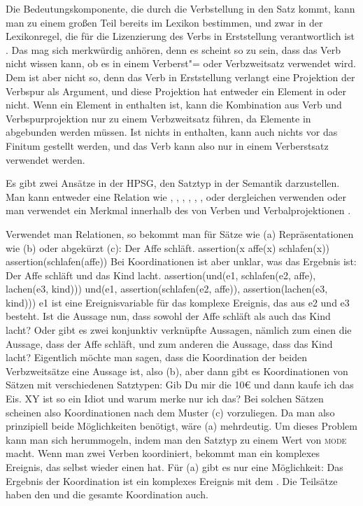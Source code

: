 Die Bedeutungskomponente, die durch die Verbstellung in den Satz kommt, kann man zu einem
großen Teil bereits im Lexikon bestimmen, und zwar in der Lexikonregel, die für die Lizenzierung
des Verbs in Erststellung verantwortlich ist \citep[]{Kiss95b}. Das mag sich merkwürdig anhören, denn es scheint
so zu sein, dass das Verb nicht wissen kann, ob es in einem Verberst"= oder Verbzweitsatz verwendet
wird. Dem ist aber nicht so, denn das Verb in Erststellung verlangt eine Projektion der Verbspur
als Argument, und diese Projektion hat entweder ein Element in \slasch oder nicht. Wenn ein Element
in \slasch enthalten ist, kann die Kombination aus Verb und Verbspurprojektion nur zu einem Verbzweitsatz
führen, da Elemente in \slasch abgebunden werden müssen. Ist nichts in \slasch enthalten, kann auch nichts
vor das Finitum gestellt werden, und das Verb kann also nur in einem Verberstsatz verwendet werden.

Es gibt zwei Ansätze in der HPSG, den Satztyp in der Semantik darzustellen. Man kann entweder eine
Relation wie , , ,
, , ,  oder dergleichen verwenden
\parencites[378, 380]{GSag2000a-u}[59]{Kathol2001a}[Abschnitt~6.1.4]{mrs}{MuellerSatztypen} oder
man verwendet ein Merkmal innerhalb des \indexwes von Verben und Verbalprojektionen
\parencites[107]{SagW99a-u}[144, 170]{Kathol2000a}.
\largerpage

Verwendet man Relationen, so bekommt man für Sätze wie (a) Repräsentationen wie (b)
oder abgekürzt (c):
\eal
\ex Der Affe schläft.
\ex assertion(\iota x affe(x) \wedge{} schlafen(x))
\ex assertion(schlafen(affe))
\zl
Bei Koordinationen ist aber unklar, was das Ergebnis ist:
\eal
\ex Der Affe schläft und das Kind lacht.
\ex assertion(und(e1, schlafen(e2, affe), lachen(e3, kind)))
\ex und(e1, assertion(schlafen(e2, affe)), assertion(lachen(e3, kind)))
\zl
e1 ist eine Ereignisvariable für das komplexe Ereignis, das aus e2 und e3 besteht.
Ist die Aussage nun, dass sowohl der Affe schläft als auch das Kind lacht? Oder gibt es zwei konjunktiv
verknüpfte Aussagen, nämlich zum einen die Aussage, dass der Affe schläft, und zum anderen die
Aussage, dass das Kind lacht? Eigentlich möchte man sagen, dass die Koordination der beiden
Verbzweitsätze eine Aussage ist, also (b), aber dann gibt es Koordinationen von Sätzen mit
verschiedenen Satztypen:
\eal
\ex Gib Du mir die 10€ und dann kaufe ich das Eis.
\ex XY ist so ein Idiot und warum merke nur ich das?
\zl
Bei solchen Sätzen scheinen also Koordinationen nach dem Muster (c) vorzuliegen. Da man also
prinzipiell beide Möglichkeiten benötigt, wäre (a) mehrdeutig. Um dieses Problem kann man
sich herummogeln, indem man den Satztyp zu einem Wert von \textsc{mode} macht. Wenn man zwei Verben
koordiniert, bekommt man ein komplexes Ereignis, das selbst wieder einen \modew hat. Für (a)
gibt es nur eine Möglichkeit: Das Ergebnis der Koordination ist ein komplexes Ereignis mit dem
\modew {}. Die Teilsätze haben den \modew {} und die gesamte Koordination auch.


